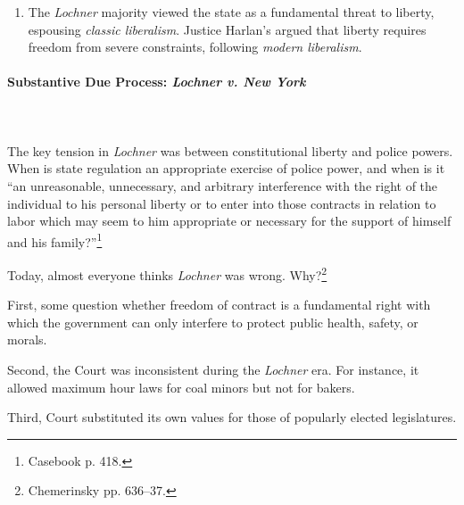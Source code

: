 \begin{enumerate}
    property without due process. It was significant because (1) it held that 
    administrative rate-setting must be subject to judicial oversight and (2) 
    courts had the responsibility to determine whether established rates were 
    reasonable. It ``practically overrule[d] \emph{Munn v. Illinois}.'' The 
    Court went on to review regulations of almost every 
    kind.\footnote{Casebook pp. 414--15.}
    \item The \emph{Lochner} majority viewed the state as a fundamental threat 
    to liberty, espousing \emph{classic liberalism}. Justice Harlan's argued 
    that liberty requires freedom from severe constraints, following 
    \emph{modern liberalism}.
\end{enumerate}

\paragraph{Substantive Due Process: \emph{Lochner v. New York}}
~\\\\
The key tension in \emph{Lochner} was between constitutional liberty and 
police powers. When is state regulation an appropriate exercise of police 
power, and when is it ``an unreasonable, unnecessary, and arbitrary 
interference with the right of the individual to his personal liberty or to 
enter into those contracts in relation to labor which may seem to him 
appropriate or necessary for the support of himself and his 
family?''\footnote{Casebook p. 418.}

Today, almost everyone thinks \emph{Lochner} was wrong. 
Why?\footnote{Chemerinsky pp. 636--37.}

First, some question whether freedom of contract is a fundamental right with 
which the government can only interfere to protect public health, safety, or 
morals.

Second, the Court was inconsistent during the \emph{Lochner} era. For 
instance, it allowed maximum hour laws for coal minors but not for bakers.

Third, Court substituted its own values for those of popularly elected 
legislatures.

